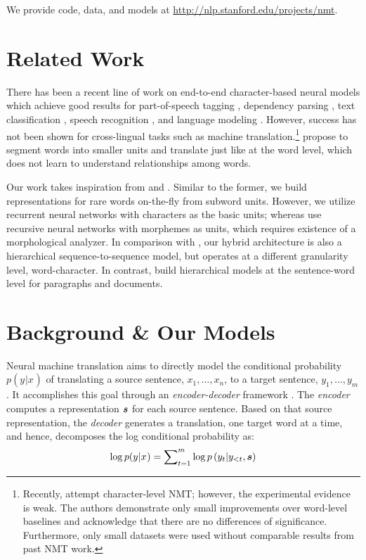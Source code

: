 \documentclass[11pt]{article}
\newcommand{\tgt}[1]{y_{#1}} %
\newcommand{\src}[1]{x_{#1}} %
\newcommand{\MB}[1]{\mbox{\boldmath{$#1$}}} %
\newcommand{\open}[1]{\left(#1\right)} %
\begin{document}
We provide code, data, and models at \url{http://nlp.stanford.edu/projects/nmt}.

\section{Related Work}
There has been a recent line of work on end-to-end character-based neural models
which achieve good results for part-of-speech tagging \cite{santos14,ling15function},
dependency parsing \cite{ballesteros15}, text classification
\cite{zhang15}, speech recognition \cite{chan16,bahdanau16}, and language
modeling \cite{kim16,rafal16}. However, success has not been shown for
cross-lingual tasks such as machine translation.\footnote{Recently,
 attempt character-level NMT; however,
the experimental evidence is weak. The authors demonstrate only small
improvements over word-level baselines and acknowledge that there are no differences of
significance. Furthermore, only small datasets were used without
comparable results from past NMT work.}
 propose to segment words into smaller units and
translate just like at the word level, which does not learn to understand
relationships among words.

Our work takes inspiration from \cite{luong13} and 
\cite{li15}. Similar to the former, we build representations for rare words
on-the-fly from subword units. However, we utilize recurrent neural networks
with characters as the basic units; whereas  use recursive neural
networks with morphemes as units, which requires existence of a
morphological analyzer. In comparison with \cite{li15}, our hybrid architecture
is also a hierarchical sequence-to-sequence model, but operates at a different
granularity level, word-character. In contrast,  build
hierarchical models at the sentence-word level for paragraphs and documents.

\section{Background \& Our Models}
\label{sec:nmt}
Neural machine translation aims to directly model the conditional probability $p(\tgt{}|\src{})$ of translating
a source sentence, $\src{1},\ldots,\src{n}$, to a target sentence, $\tgt{1},\ldots,\tgt{m}$.
It accomplishes this goal through an {\it encoder-decoder} framework
\cite{kal13,sutskever14,cho14}. The {\it encoder} computes a representation $\MB{s}$
for each source sentence. Based on that source representation,
the {\it decoder} generates a translation, one target word at a time, and hence,
decomposes the log conditional probability as:
\begin{equation}
\log p(\tgt{}|\src{}) = \sum_{t=1}^m \nolimits \log
p\open{\tgt{t}|\tgt{<t},\MB{s}}
\label{e:s2s}
\end{equation}
\end{document}
